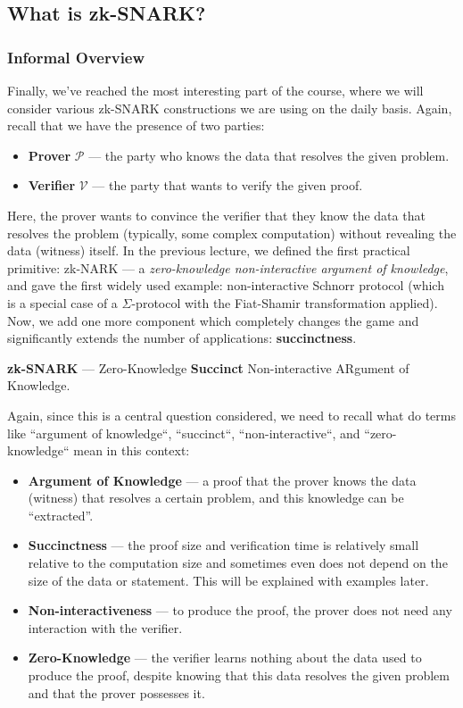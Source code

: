 \documentclass[../lecture-notes-148x210.tex]{subfiles}
\begin{document}
\subsection{What is zk-SNARK?}

\subsubsection{Informal Overview}

Finally, we've reached the most interesting part of the course, where we will consider various zk-SNARK constructions we are using on the daily basis. Again, recall that we have the presence of two parties:
\begin{itemize}
    \item \textbf{Prover} $\mathcal{P}$ --- the party who knows the data that resolves the given problem.
    \item \textbf{Verifier} $\mathcal{V}$ --- the party that wants to verify the given proof.
\end{itemize}

Here, the prover wants to convince the verifier that they know the data that resolves the problem (typically, some complex computation) without revealing the data (witness) itself. In the previous lecture, we defined the first practical primitive: zk-NARK --- a \textit{zero-knowledge non-interactive argument of knowledge}, and gave the first widely used example: non-interactive Schnorr protocol (which is a special case of a $\Sigma$-protocol with the Fiat-Shamir transformation applied). Now, we add one more component which completely changes the game and significantly extends the number of applications: \textbf{succinctness}.

\begin{definition}
    \textbf{zk-SNARK} --- Zero-Knowledge \textbf{Succinct} Non-interactive ARgument of Knowledge.
\end{definition}

Again, since this is a central question considered, we need to recall what do terms like ``argument of knowledge``, ``succinct``, ``non-interactive``, and 
``zero-knowledge`` mean in this context:

\begin{itemize}
    \item \textbf{Argument of Knowledge} --- a proof that the prover knows the data (witness) that resolves a certain
    problem, and this knowledge can be ``extracted''.
    \item \textbf{Succinctness} --- the proof size and verification time is relatively small relative to the computation size and sometimes even does not depend on the size of 
    the data or statement. This will be explained with examples later.
    \item \textbf{Non-interactiveness} --- to produce the proof, the prover does not need any interaction
    with the verifier.
    \item \textbf{Zero-Knowledge} --- the verifier learns nothing about the data used to produce the
    proof, despite knowing that this data resolves the given problem and that the prover possesses it.
\end{itemize}
\end{document}
